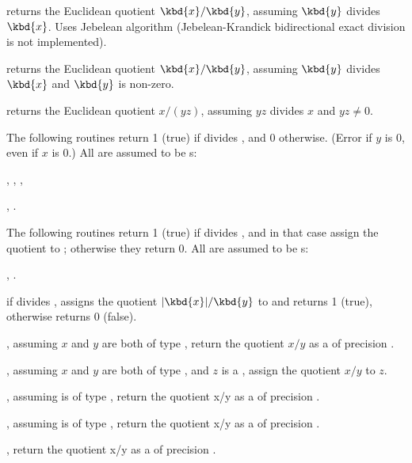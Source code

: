  returns the Euclidean quotient
$\kbd{x} / \kbd{y}$, assuming $\kbd{y}$ divides $\kbd{x}$. Uses Jebelean
algorithm (Jebelean-Krandick bidirectional exact division is not
implemented).

 returns the Euclidean quotient
$\kbd{x} / \kbd{y}$, assuming $\kbd{y}$ divides
$\kbd{x}$ and $\kbd{y}$ is non-zero.

 returns the Euclidean
quotient $x/(yz)$, assuming $yz$ divides $x$ and $yz \neq 0$.

The following routines return 1 (true) if  divides , and
0 otherwise. (Error if $y$ is $0$, even if $x$ is $0$.) All  are
assumed to be s:

,
,
,

,
.

The following routines return 1 (true) if  divides , and in
that case assign the quotient to ; otherwise they return 0. All
 are assumed to be s:

,
.

 if  divides , assigns
the quotient $|\kbd{x}|/\kbd{y}$ to  and returns 1 (true), otherwise
returns 0 (false).


, assuming $x$ and $y$
are both of type , return the quotient $x/y$ as a  of
precision .

, assuming $x$ and $y$
are both of type , and $z$ is a ,
assign the quotient $x/y$ to $z$.

, assuming 
is of type , return the quotient x/y as a  of
precision .

, assuming 
is of type , return the quotient x/y as a  of
precision .

, return the quotient x/y as a
 of precision .


